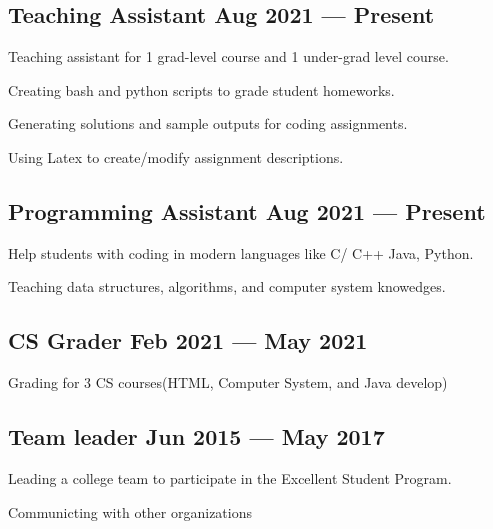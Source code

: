 \documentclass[letter,10pt]{article}
\begin{document}
\subsection{{Teaching Assistant \hfill Aug 2021 --- Present}}
\begin{zitemize}
    \item Teaching assistant for 1 grad-level course and 1 under-grad level course.
    \item Creating bash and python scripts to grade student homeworks.
    \item Generating solutions and sample outputs for coding assignments.
    \item Using Latex to create/modify assignment descriptions.
\end{zitemize}


\subsection{{Programming Assistant \hfill Aug 2021 --- Present}}
\begin{zitemize}
    \item Help students with coding in modern languages like C/ C++ Java, Python.
    \item Teaching data structures, algorithms, and computer system knowedges.
\end{zitemize}


\subsection{{CS Grader \hfill Feb 2021 --- May 2021}}
\begin{zitemize}
    \item Grading for 3 CS courses(HTML, Computer System, and Java develop)
\end{zitemize}


\subsection{{Team leader \hfill Jun 2015 --- May 2017}}
\begin{zitemize}
    \item Leading a college team to participate in the Excellent Student Program.
    \item Communicting with other organizations
\end{zitemize}
\end{document}
